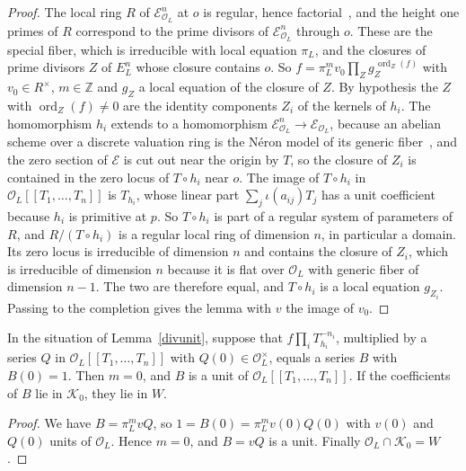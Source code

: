 \begin{proof}
The local ring $R$ of $\mathcal E^n_{\mathcal O_L}$ at $o$ is regular, hence factorial~\cite[Theorem~20.3]{matsumura}, and the height one primes of $R$ correspond to the prime divisors of $\mathcal E^n_{\mathcal O_L}$ through $o$. These are the special fiber, which is irreducible with local equation $\pi_L$, and the closures of prime divisors $Z$ of $E^n_L$ whose closure contains $o$. So $f=\pi_L^mv_0\prod_Zg_Z^{\,\operatorname{ord}_Z(f)}$ with $v_0\in R^\times$, $m\in\mathbb Z$ and $g_Z$ a local equation of the closure of $Z$. By hypothesis the $Z$ with $\operatorname{ord}_Z(f)\ne0$ are the identity components $Z_i$ of the kernels of $h_i$. The homomorphism $h_i$ extends to a homomorphism $\mathcal E^n_{\mathcal O_L}\to\mathcal E_{\mathcal O_L}$, because an abelian scheme over a discrete valuation ring is the N\'eron model of its generic fiber~\cite[Section~1.2, Proposition~8]{blr}, and the zero section of $\mathcal E$ is cut out near the origin by $T$, so the closure of $Z_i$ is contained in the zero locus of $T\circ h_i$ near $o$. The image of $T\circ h_i$ in $\mathcal O_L[[T_1,\dots,T_n]]$ is $T_{h_i}$, whose linear part $\sum_j\iota(a_{ij})T_j$ has a unit coefficient because $h_i$ is primitive at $p$. So $T\circ h_i$ is part of a regular system of parameters of $R$, and $R/(T\circ h_i)$ is a regular local ring of dimension $n$, in particular a domain. Its zero locus is irreducible of dimension $n$ and contains the closure of $Z_i$, which is irreducible of dimension $n$ because it is flat over $\mathcal O_L$ with generic fiber of dimension $n-1$. The two are therefore equal, and $T\circ h_i$ is a local equation $g_{Z_i}$. Passing to the completion gives the lemma with $v$ the image of $v_0$.
\end{proof}

\begin{lemma}\label{normalize}
In the situation of Lemma~\ref{divunit}, suppose that $f\prod_iT_{h_i}^{-n_i}$, multiplied by a series $Q$ in $\mathcal O_L[[T_1,\dots,T_n]]$ with $Q(0)\in\mathcal O_L^\times$, equals a series $B$ with $B(0)=1$. Then $m=0$, and $B$ is a unit of $\mathcal O_L[[T_1,\dots,T_n]]$. If the coefficients of $B$ lie in $\mathcal K_0$, they lie in $W$.
\end{lemma}

\begin{proof}
We have $B=\pi_L^mvQ$, so $1=B(0)=\pi_L^mv(0)Q(0)$ with $v(0)$ and $Q(0)$ units of $\mathcal O_L$. Hence $m=0$, and $B=vQ$ is a unit. Finally $\mathcal O_L\cap\mathcal K_0=W$.
\end{proof}

